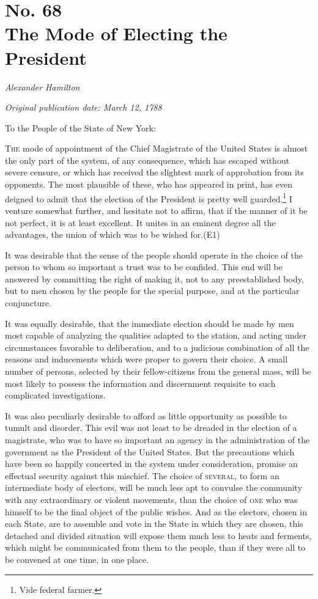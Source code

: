 \chapter[No. 68: The Mode of Electing the President]{No. 68\\ {\small The Mode of Electing the President}}

\textit{Alexander Hamilton}

\textit{Original publication date: March 12, 1788}
\vspace{1cm}

To the People of the State of New York:
\vspace{.4cm}

\textsc{The} mode of appointment of the Chief Magistrate of the United States is almost the only part of the system, of any consequence, which has escaped without severe censure, or which has received the slightest mark of approbation from its opponents. 
The most plausible of these, who has appeared in print, has even deigned to admit that the election of the President is pretty well guarded.\footnote{Vide federal farmer.} I venture somewhat further, and hesitate not to affirm, that if the manner of it be not perfect, it is at least excellent. 
It unites in an eminent degree all the advantages, the union of which was to be wished for.(E1)

It was desirable that the sense of the people should operate in the choice of the person to whom so important a trust was to be confided. 
This end will be answered by committing the right of making it, not to any preestablished body, but to men chosen by the people for the special purpose, and at the particular conjuncture.

It was equally desirable, that the immediate election should be made by men most capable of analyzing the qualities adapted to the station, and acting under circumstances favorable to deliberation, and to a judicious combination of all the reasons and inducements which were proper to govern their choice. 
A small number of persons, selected by their fellow-citizens from the general mass, will be most likely to possess the information and discernment requisite to such complicated investigations.

It was also peculiarly desirable to afford as little opportunity as possible to tumult and disorder. 
This evil was not least to be dreaded in the election of a magistrate, who was to have so important an agency in the administration of the government as the President of the United States. 
But the precautions which have been so happily concerted in the system under consideration, promise an effectual security against this mischief. 
The choice of \textsc{several}, to form an intermediate body of electors, will be much less apt to convulse the community with any extraordinary or violent movements, than the choice of \textsc{one} who was himself to be the final object of the public wishes. 
And as the electors, chosen in each State, are to assemble and vote in the State in which they are chosen, this detached and divided situation will expose them much less to heats and ferments, which might be communicated from them to the people, than if they were all to be convened at one time, in one place.

